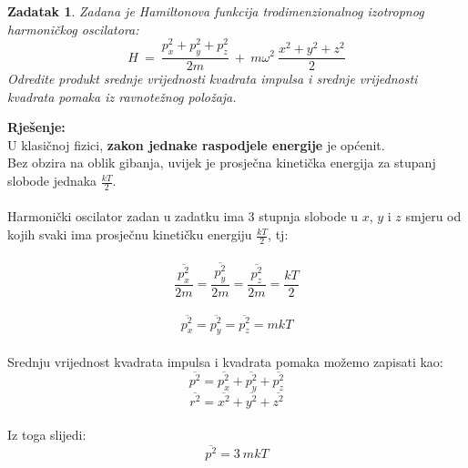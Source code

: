\documentclass[a4paper,12pt]{article}
\newtheorem{ZDK}{Zadatak}[section]
\begin{document}
\newpage
\begin{ZDK}
	Zadana je Hamiltonova funkcija trodimenzionalnog izotropnog harmoni\v{c}kog oscilatora:
	$$ H\ =\ \frac{p_x^2+p_y^2+p_z^2}{2m}\ +\ m\omega^2\ \frac{x^2+y^2+z^2}{2} $$
	Odredite produkt srednje vrijednosti kvadrata impulsa i srednje vrijednosti kvadrata pomaka iz ravnote\v{z}nog polo\v{z}aja.
\end{ZDK}
\textbf{Rje\v{s}enje:} \\
\newline
U klasi\v{c}noj fizici, \textbf{zakon jednake raspodjele energije} je op\'cenit. 
\\
Bez obzira na oblik gibanja, uvijek je prosje\v{c}na kineti\v{c}ka energija za stupanj slobode jednaka $\frac{kT}{2}$.
\\
\\
Harmoni\v{c}ki oscilator zadan u zadatku ima $3$ stupnja slobode u $x$, $y$ i $z$ smjeru od kojih svaki ima prosje\v{c}nu kineti\v{c}ku energiju $\frac{kT}{2}$, tj:
\\
\\
$$ \overline{\frac{p_x^2}{2m}} = \overline{\frac{p_y^2}{2m}} = \overline{\frac{p_z^2}{2m}} = \frac{kT}{2} $$
\\
$$ \overline{p_x^2} = \overline{p_y^2} = \overline{p_z^2} = mkT $$
\\
Srednju vrijednost kvadrata impulsa i kvadrata pomaka mo\v{z}emo zapisati kao:
\\
$$ \overline{p^2} = \overline{p_x^2} + \overline{p_y^2} + \overline{p_z^2} $$
$$ \overline{r^2} = \overline{x^2} + \overline{y^2} + \overline{z^2} $$
\\
Iz toga slijedi:
\\
$$ \overline{p^2} = 3\ mkT $$
\end{document}
